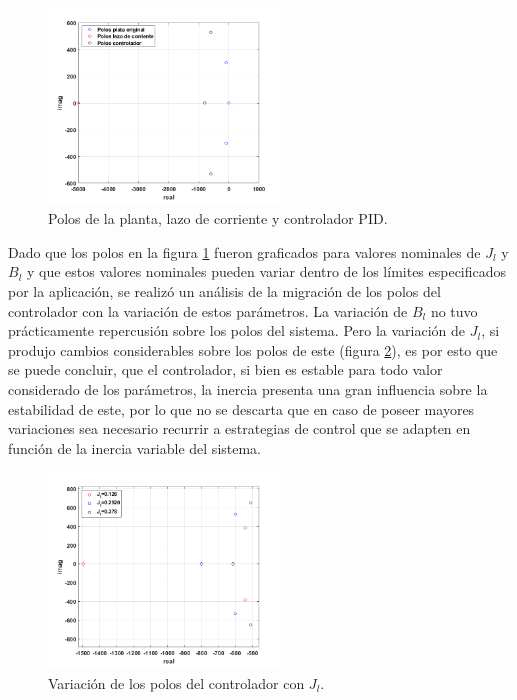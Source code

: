 \documentclass[10pt]{article}
\begin{document}
	\begin{figure}[!h]
	\centering
	\includegraphics[width=0.55\textwidth]{Polosmodelos.png}
	\caption{\label{fig:Polosmodelos}Polos de la planta, lazo de corriente y controlador PID.}
	\end{figure}
	
	Dado que los polos en la figura \ref{fig:Polosmodelos} fueron graficados para valores nominales de $J_{l}$ y $B_{l}$ y que estos valores nominales pueden variar dentro de los límites especificados por la aplicación, se realizó un análisis de la migración de los polos del controlador con la variación de estos parámetros. La variación de $B_{l}$ no tuvo prácticamente repercusión sobre los polos del sistema. Pero la variación de $J_{l}$, si produjo cambios considerables sobre los polos de este (figura \ref{fig:PoloJeq}), es por esto que se puede concluir, que el controlador, si bien es estable para todo valor considerado de los parámetros, la inercia presenta una gran influencia sobre la estabilidad de este, por lo que no se descarta que en caso de poseer mayores variaciones sea necesario recurrir a estrategias de control que se adapten en función de la inercia variable del sistema.
	\begin{figure}[h!]
	\centering
	\includegraphics[width=0.55\textwidth]{PoloJeq.png}
	\caption{\label{fig:PoloJeq}Variación de los polos del controlador con $J_{l}$.}
	\end{figure}
	
\end{document}
